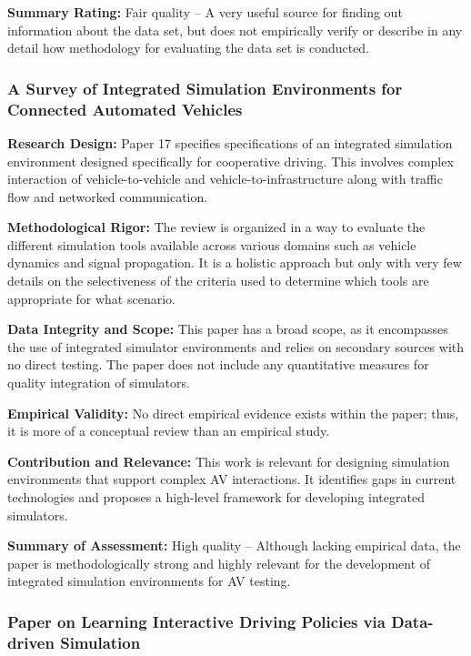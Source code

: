 \documentclass[lettersize,journal]{IEEEtran}
\begin{document}
\textbf{Summary Rating:} Fair quality – A very useful source for finding out information about the data set, but does not empirically verify or describe in any detail how methodology for evaluating the data set is conducted.

\subsubsection{A Survey of Integrated Simulation Environments for Connected Automated Vehicles \cite{ref57}}

\textbf{Research Design:} Paper 17 specifies specifications of an integrated simulation environment designed specifically for cooperative driving. This involves complex interaction of vehicle-to-vehicle and vehicle-to-infrastructure along with traffic flow and networked communication.

\textbf{Methodological Rigor:} The review is organized in a way to evaluate the different simulation tools available across various domains such as vehicle dynamics and signal propagation. It is a holistic approach but only with very few details on the selectiveness of the criteria used to determine which tools are appropriate for what scenario.

\textbf{Data Integrity and Scope:} This paper has a broad scope, as it encompasses the use of integrated simulator environments and relies on secondary sources with no direct testing. The paper does not include any quantitative measures for quality integration of simulators.

\textbf{Empirical Validity:} No direct empirical evidence exists within the paper; thus, it is more of a conceptual review than an empirical study.

\textbf{Contribution and Relevance:} This work is relevant for designing simulation environments that support complex AV interactions. It identifies gaps in current technologies and proposes a high-level framework for developing integrated simulators.

\textbf{Summary of Assessment:} High quality – Although lacking empirical data, the paper is methodologically strong and highly relevant for the development of integrated simulation environments for AV testing.

\subsubsection{Paper on Learning Interactive Driving Policies via Data-driven Simulation \cite{ref58}}
\end{document}
